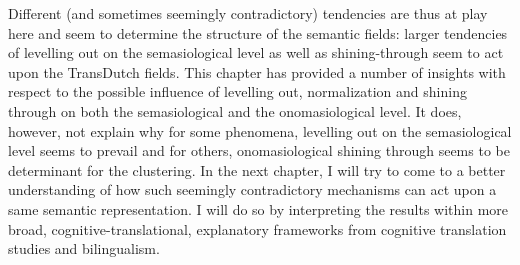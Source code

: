 Different (and sometimes seemingly contradictory) tendencies are thus at play here and seem to determine the structure of the semantic fields: larger tendencies of levelling out on the semasiological level as well as shining-through seem to act upon the TransDutch fields. This chapter has provided a number of insights with respect to the possible influence of levelling out, normalization and shining through on both the semasiological and the onomasiological level. It does, however, not explain why for some phenomena, levelling out on the semasiological level seems to prevail and for others, onomasiological shining through seems to be determinant for the clustering. In the next chapter, I will try to come to a better understanding of how such seemingly contradictory mechanisms can act upon a same semantic representation. I will do so by interpreting the results within more broad, cognitive-translational, explanatory frameworks from cognitive translation studies and bilingualism.
